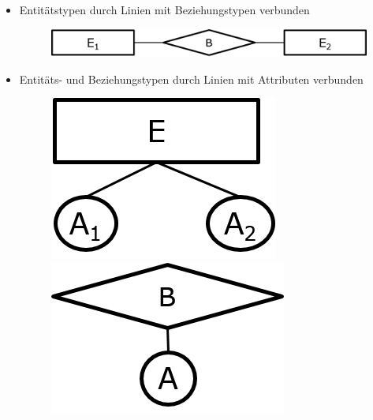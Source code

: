 \begin{frame}{\insertsection}
\begin{itemize}
	\item Entit\"atstypen durch Linien mit Beziehungstypen verbunden
	\begin{figure}
		\includegraphics[scale=0.5]{img/ERM-EntitaetRelationTyp.png}
	\end{figure}  
	\item Entit\"ats- und Beziehungstypen durch Linien mit Attributen verbunden
	\begin{figure}
	 \centering
	 \begin{minipage}{0.3\linewidth}
		\centering
		\includegraphics[scale=0.5]{img/ERM-EntitaetAttributTyp.png}
	 \end{minipage}
 	 \begin{minipage}{0.3\linewidth}
		\centering
		\includegraphics[scale=0.5]{img/ERM-RelationAttributTyp.png}
   \end{minipage}
	\end{figure}    
\end{itemize}
\end{frame}

